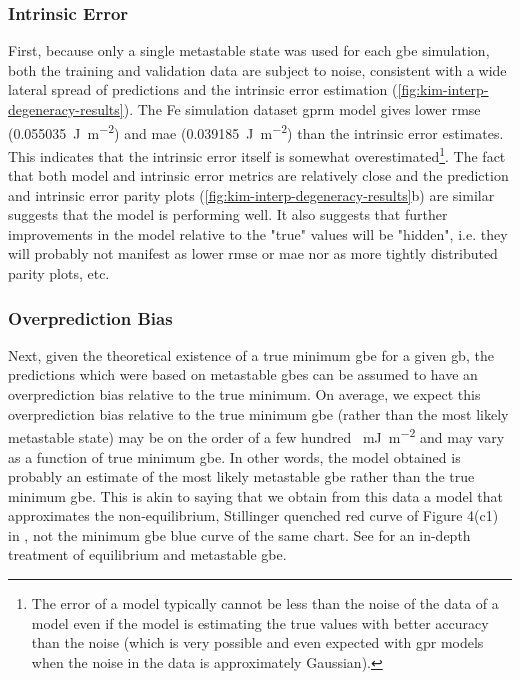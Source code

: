 \documentclass[final,twocolumn,12pt]{elsarticle}
\begin{document}
    \subsubsection{Intrinsic Error} \label{sec:discuss:lit:error}
	First, because only a single metastable state was used for each \gls{gbe} simulation, both the training and validation data are subject to noise, consistent with a wide lateral spread of predictions and the intrinsic error estimation (\cref{fig:kim-interp-degeneracy-results}). The Fe simulation dataset \gls{gprm} model gives lower \gls{rmse} (\SI{0.055035}{\joule\per\square\meter}) and \gls{mae} (\SI{0.039185}{\joule\per\square\meter}) than the intrinsic error estimates. This indicates that the intrinsic error itself is somewhat overestimated\footnote{The \outpt{} error of a model typically cannot be less than the noise of the \outpt{} data of a model even if the model is estimating the true \outpt{} values with better accuracy than the noise (which is very possible and even expected with \gls{gpr} models when the noise in the \inpt{} data is approximately Gaussian).}. The fact that both model and intrinsic error metrics are relatively close and the prediction \cite{bairdFiveDegreeofFreedomPropertyUnderReview} and intrinsic error parity plots (\cref{fig:kim-interp-degeneracy-results}b) are similar suggests that the model is performing well. It also suggests that further improvements in the model relative to the "true" values will be "hidden", i.e. they will probably not manifest as lower \gls{rmse} or \gls{mae} nor as more tightly distributed parity plots, etc.
	
	\subsubsection{Overprediction Bias} \label{sec:discuss:lit:overprediction}
	Next, given the theoretical existence of a true minimum \gls{gbe} for a given \gls{gb}, the predictions which were based on metastable \glspl{gbe} can be assumed to have an overprediction bias relative to the true minimum. On average, we expect this overprediction bias relative to the true minimum \gls{gbe} (rather than the most likely metastable state) may be on the order of a few hundred \SI{}{\milli\J\per\square\m} and may vary as a function of true minimum \gls{gbe}. In other words, the model obtained is probably an estimate of the most likely metastable \gls{gbe} rather than the true minimum \gls{gbe}. This is akin to saying that we obtain from this data a model that approximates the non-equilibrium, Stillinger quenched red curve of Figure 4(c1) in \cite{hanGrainboundaryMetastabilityIts2016}, not the minimum \gls{gbe} blue curve of the same chart. See \cite{hanGrainboundaryMetastabilityIts2016} for an in-depth treatment of equilibrium and metastable \gls{gbe}.
	
\end{document}
